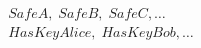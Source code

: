 \documentclass[preview,border=4pt]{standalone}
\begin{document}
\[
\begin{aligned}
        SafeA,\; SafeB,\; SafeC,\ldots\\
        HasKeyAlice,\; HasKeyBob,\ldots
      \end{aligned}
\]
\end{document}
